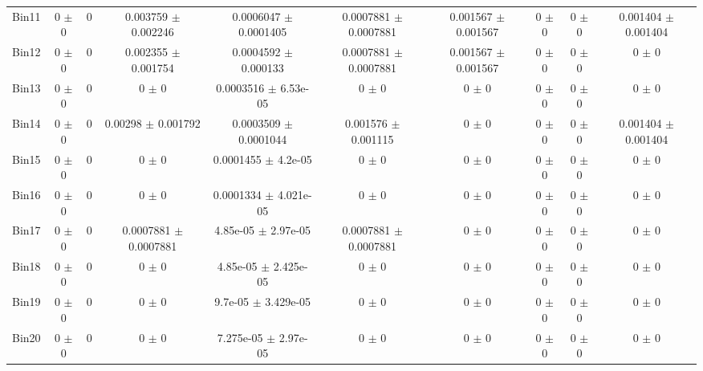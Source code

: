 \begin{tabular}{@{\extracolsep{4pt}}lccccccccc@{}}
     Bin11 & 0 $\pm$ 0 & 0 & 0.003759 $\pm$ 0.002246 & 0.0006047 $\pm$ 0.0001405 & 0.0007881 $\pm$ 0.0007881 & 0.001567 $\pm$ 0.001567 & 0 $\pm$ 0 & 0 $\pm$ 0 & 0.001404 $\pm$ 0.001404 \\ 
     Bin12 & 0 $\pm$ 0 & 0 & 0.002355 $\pm$ 0.001754 & 0.0004592 $\pm$ 0.000133 & 0.0007881 $\pm$ 0.0007881 & 0.001567 $\pm$ 0.001567 & 0 $\pm$ 0 & 0 $\pm$ 0 & 0 $\pm$ 0 \\ 
     Bin13 & 0 $\pm$ 0 & 0 & 0 $\pm$ 0 & 0.0003516 $\pm$ 6.53e-05 & 0 $\pm$ 0 & 0 $\pm$ 0 & 0 $\pm$ 0 & 0 $\pm$ 0 & 0 $\pm$ 0 \\ 
     Bin14 & 0 $\pm$ 0 & 0 & 0.00298 $\pm$ 0.001792 & 0.0003509 $\pm$ 0.0001044 & 0.001576 $\pm$ 0.001115 & 0 $\pm$ 0 & 0 $\pm$ 0 & 0 $\pm$ 0 & 0.001404 $\pm$ 0.001404 \\ 
     Bin15 & 0 $\pm$ 0 & 0 & 0 $\pm$ 0 & 0.0001455 $\pm$ 4.2e-05 & 0 $\pm$ 0 & 0 $\pm$ 0 & 0 $\pm$ 0 & 0 $\pm$ 0 & 0 $\pm$ 0 \\ 
     Bin16 & 0 $\pm$ 0 & 0 & 0 $\pm$ 0 & 0.0001334 $\pm$ 4.021e-05 & 0 $\pm$ 0 & 0 $\pm$ 0 & 0 $\pm$ 0 & 0 $\pm$ 0 & 0 $\pm$ 0 \\ 
     Bin17 & 0 $\pm$ 0 & 0 & 0.0007881 $\pm$ 0.0007881 & 4.85e-05 $\pm$ 2.97e-05 & 0.0007881 $\pm$ 0.0007881 & 0 $\pm$ 0 & 0 $\pm$ 0 & 0 $\pm$ 0 & 0 $\pm$ 0 \\ 
     Bin18 & 0 $\pm$ 0 & 0 & 0 $\pm$ 0 & 4.85e-05 $\pm$ 2.425e-05 & 0 $\pm$ 0 & 0 $\pm$ 0 & 0 $\pm$ 0 & 0 $\pm$ 0 & 0 $\pm$ 0 \\ 
     Bin19 & 0 $\pm$ 0 & 0 & 0 $\pm$ 0 & 9.7e-05 $\pm$ 3.429e-05 & 0 $\pm$ 0 & 0 $\pm$ 0 & 0 $\pm$ 0 & 0 $\pm$ 0 & 0 $\pm$ 0 \\ 
     Bin20 & 0 $\pm$ 0 & 0 & 0 $\pm$ 0 & 7.275e-05 $\pm$ 2.97e-05 & 0 $\pm$ 0 & 0 $\pm$ 0 & 0 $\pm$ 0 & 0 $\pm$ 0 & 0 $\pm$ 0 \\ 
\hline\hline
  \end{tabular}
